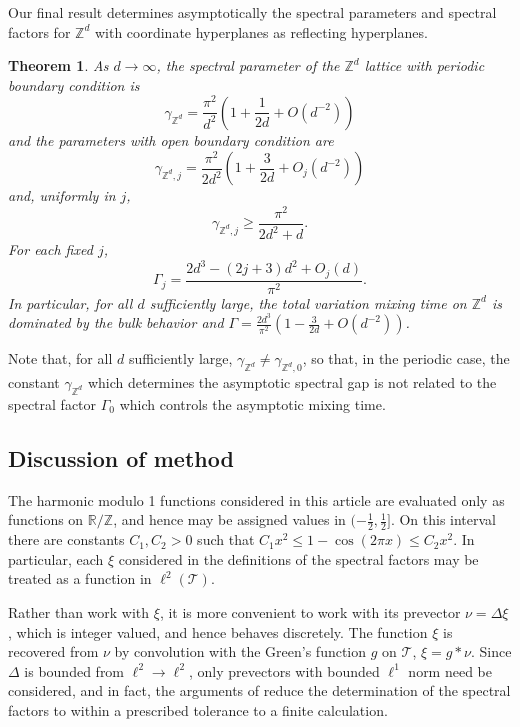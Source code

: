 \documentclass[a4paper, 12pt, notitlepage]{amsart}
\newcommand{\bR}{\mathbb{R}}
\newcommand{\zed}{\mathbb{Z}}
\newcommand{\sT}{\mathscr{T}}
\newtheorem{theorem}{Theorem}
\theoremstyle{remark}
\begin{document}
Our final result determines asymptotically the spectral parameters and spectral factors for $\zed^d$ with coordinate hyperplanes as reflecting hyperplanes. 
\begin{theorem}\label{asymptotic_theorem}
 As $d \to \infty$, the spectral parameter of the $\zed^d$ lattice with periodic boundary condition is
  \begin{equation}
  \gamma_{\zed^d} = \frac{\pi^2}{d^2}\left(1 + \frac{1}{2d} + O\left(d^{-2}\right)\right)
 \end{equation}
 and the parameters with open boundary condition are
\begin{equation}
 \gamma_{\zed^d,j} = \frac{\pi^2}{2d^2} \left(1 + \frac{3}{2d} + O_j\left(d^{-2}\right)\right)
\end{equation}
and, uniformly in $j$,
\begin{equation}
 \gamma_{\zed^d, j} \geq \frac{\pi^2}{2d^2 + d}.
\end{equation}
For each fixed $j$,
\begin{equation}
 \Gamma_j = \frac{2d^3 -(2j+3)d^2 + O_j(d)}{\pi^2}.
\end{equation}
In particular, for all $d$ sufficiently large, the total variation mixing time on $\zed^d$ is dominated by the bulk behavior and $\Gamma = \frac{2d^3}{\pi^2}\left(1 - \frac{3}{2d} + O\left(d^{-2}\right)\right)$.
\end{theorem}
Note that, for all $d$ sufficiently large,  $\gamma_{\zed^d} \neq \gamma_{\zed^d,0}$, so that, in the periodic case, the constant $\gamma_{\zed^d}$ which determines the asymptotic spectral gap is not related to the spectral factor $\Gamma_0$ which controls the asymptotic mixing time.

\subsection{Discussion of method}
The harmonic modulo 1 functions considered in this article are evaluated only as functions on $\bR/\zed$, and hence may be assigned values in $(-\frac{1}{2}, \frac{1}{2}]$. On this interval there are constants $C_1, C_2>0$ such that $C_1 x^2 \leq 1-\cos(2\pi x) \leq C_2 x^2$.  In particular, each $\xi$ considered in the definitions of the spectral factors may be treated as a function in $\ell^2(\sT)$.  

Rather than work with $\xi$, it is more convenient to work with its prevector $\nu = \Delta \xi$, which is integer valued, and hence behaves discretely. The function $\xi$ is recovered from $\nu$ by convolution with the Green's function $g$ on $\sT$, $\xi = g*\nu$.  Since $\Delta$ is bounded from $\ell^2 \to \ell^2$, only prevectors with bounded $\ell^1$ norm need be considered, and in fact, the arguments of \cite{HS19} reduce the determination of the spectral factors to within a prescribed tolerance to a finite calculation.
\end{document}
